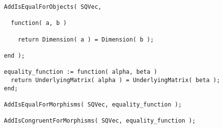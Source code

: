 \begin{small}
\begin{Verbatim}[frame=single]
AddIsEqualForObjects( SQVec,
  
  function( a, b )
    
    return Dimension( a ) = Dimension( b );
  
end );

equality_function := function( alpha, beta )
  return UnderlyingMatrix( alpha ) = UnderlyingMatrix( beta );
end;

AddIsEqualForMorphisms( SQVec, equality_function );

AddIsCongruentForMorphisms( SQVec, equality_function );
\end{Verbatim}
\end{small}